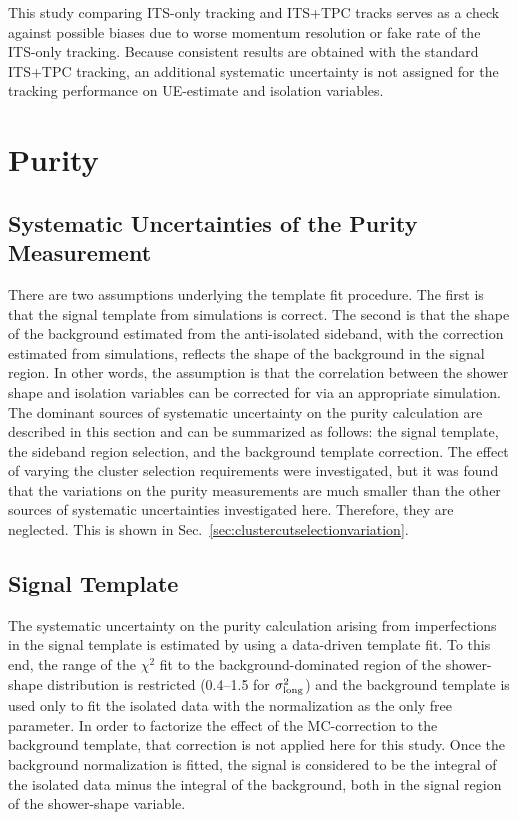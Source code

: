 This study comparing ITS-only tracking and ITS+TPC tracks serves as a check against possible biases due to worse momentum resolution or fake rate of the ITS-only tracking. Because consistent results are obtained with the standard ITS+TPC tracking, an additional systematic uncertainty is not assigned for the tracking performance on UE-estimate and isolation variables. 



\section{Purity}
\subsection{Systematic Uncertainties of the Purity Measurement}
\label{sec:puritysystematics}
There are two assumptions underlying the template fit procedure. The first is that the signal template from simulations is correct. The second is that the shape of the background estimated from the anti-isolated sideband, with the correction estimated from simulations, reflects the shape of the background in the signal region. In other words, the assumption is that the correlation between the shower shape and isolation variables can be corrected for via an appropriate simulation. The dominant sources of systematic uncertainty on the purity calculation are described in this section and can be summarized as follows: the signal template, the sideband region selection, and the background template correction. The effect of varying the cluster selection requirements were investigated, but it was found that the variations on the purity measurements are much smaller than the other sources of systematic uncertainties investigated here. Therefore, they are neglected. This is shown in Sec.~\ref{sec:clustercutselectionvariation}. 

\subsection{Signal Template}
The systematic uncertainty on the purity calculation arising from imperfections in the signal template is estimated by using a data-driven template fit. To this end, the range of the $\chi^{2}$ fit to the background-dominated region of the shower-shape distribution is restricted (0.4--1.5 for $\sigma^{2}_{\mathrm{long}}$) and the background template is used only to fit the isolated data with the normalization as the only free parameter. In order to factorize the effect of the MC-correction to the background template, that correction is not applied here for this study. Once the background normalization is fitted, the signal is considered to be the integral of the isolated data minus the integral of the background, both in the signal region of the shower-shape variable. 

